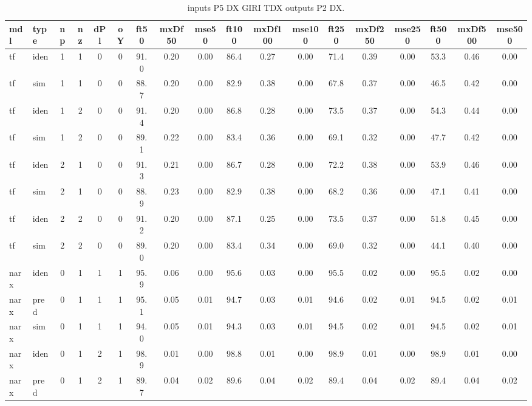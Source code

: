 \begin{landscape} 
 \begin{center} 
 \footnotesize 
 \begin{longtable}{ll|cccc|ccc|ccc|ccc|ccc} 
\caption[inputs P5 DX GIRI TDX   outputs P2 DX]{inputs P5 DX GIRI TDX   outputs P2 DX.} 
\label{tab:inputs_P5_DX_GIRI_TDX___outputs_P2_DX} 
\hline 
  mdl & type & np & nz & dPl & oY & ft50 & mxDf50 & mse50 & ft100 & mxDf100 & mse100 & ft250 & mxDf250 & mse250 & ft500 & mxDf500 & mse500 \\ 
 \hline 
tf  & iden & 1 & 1 & 0 & 0 & 91.0 & 0.20 & 0.00 & 86.4 & 0.27 & 0.00 & 71.4 & 0.39 & 0.00 & 53.3 & 0.46 & 0.00 \\ 
tf  & sim  & 1 & 1 & 0 & 0 & 88.7 & 0.20 & 0.00 & 82.9 & 0.38 & 0.00 & 67.8 & 0.37 & 0.00 & 46.5 & 0.42 & 0.00 \\ 
 \hline 
tf  & iden & 1 & 2 & 0 & 0 & 91.4 & 0.20 & 0.00 & 86.8 & 0.28 & 0.00 & 73.5 & 0.37 & 0.00 & 54.3 & 0.44 & 0.00 \\ 
tf  & sim  & 1 & 2 & 0 & 0 & 89.1 & 0.22 & 0.00 & 83.4 & 0.36 & 0.00 & 69.1 & 0.32 & 0.00 & 47.7 & 0.42 & 0.00 \\ 
 \hline 
tf  & iden & 2 & 1 & 0 & 0 & 91.3 & 0.21 & 0.00 & 86.7 & 0.28 & 0.00 & 72.2 & 0.38 & 0.00 & 53.9 & 0.46 & 0.00 \\ 
tf  & sim  & 2 & 1 & 0 & 0 & 88.9 & 0.23 & 0.00 & 82.9 & 0.38 & 0.00 & 68.2 & 0.36 & 0.00 & 47.1 & 0.41 & 0.00 \\ 
 \hline 
tf  & iden & 2 & 2 & 0 & 0 & 91.2 & 0.20 & 0.00 & 87.1 & 0.25 & 0.00 & 73.5 & 0.37 & 0.00 & 51.8 & 0.45 & 0.00 \\ 
tf  & sim  & 2 & 2 & 0 & 0 & 89.0 & 0.20 & 0.00 & 83.4 & 0.34 & 0.00 & 69.0 & 0.32 & 0.00 & 44.1 & 0.40 & 0.00 \\ 
 \hline 
narx & iden & 0 & 1 & 1 & 1 & 95.9 & 0.06 & 0.00 & 95.6 & 0.03 & 0.00 & 95.5 & 0.02 & 0.00 & 95.5 & 0.02 & 0.00 \\ 
narx & pred & 0 & 1 & 1 & 1 & 95.1 & 0.05 & 0.01 & 94.7 & 0.03 & 0.01 & 94.6 & 0.02 & 0.01 & 94.5 & 0.02 & 0.01 \\ 
narx & sim  & 0 & 1 & 1 & 1 & 94.0 & 0.05 & 0.01 & 94.3 & 0.03 & 0.01 & 94.5 & 0.02 & 0.01 & 94.5 & 0.02 & 0.01 \\ 
 \hline 
narx & iden & 0 & 1 & 2 & 1 & 98.9 & 0.01 & 0.00 & 98.8 & 0.01 & 0.00 & 98.9 & 0.01 & 0.00 & 98.9 & 0.01 & 0.00 \\ 
narx & pred & 0 & 1 & 2 & 1 & 89.7 & 0.04 & 0.02 & 89.6 & 0.04 & 0.02 & 89.4 & 0.04 & 0.02 & 89.4 & 0.04 & 0.02 \\ 

\end{longtable}
\end{center}
\end{landscape}

